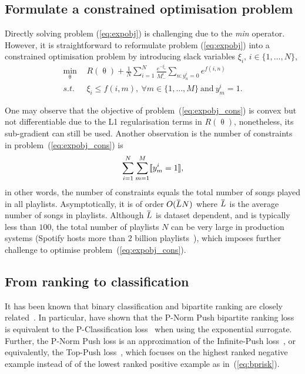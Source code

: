 \subsection{Formulate a constrained optimisation problem}



Directly solving problem (\ref{eq:expobj}) is challenging due to the \emph{min} operator.
However, it is straightforward to reformulate problem (\ref{eq:expobj}) into a constrained optimisation problem
by introducing slack variables $\xi_i, \, i \in \{1,\dots,N\}$,
\begin{equation}
\label{eq:expobj_cons}
\begin{aligned}
\min_{\uptheta} \ \, & R(\uptheta) + \frac{1}{N} \sum_{i=1}^N \frac{e^{-\xi_i}}{M_-^i} \sum_{n: y_n^i = 0} e^{f(i, n)} \\
s.t. \ \, & \xi_i \le f(i, m), \ \forall m \in \{1,\dots,M\} \ \text{and} \ y_m^i = 1.
\end{aligned}
\end{equation}

One may observe that the objective of problem~(\ref{eq:expobj_cons}) is convex but not differentiable due to the L1 regularisation terms in $R(\uptheta)$,
nonetheless, its sub-gradient can still be used.
Another observation is the number of constraints in problem~(\ref{eq:expobj_cons}) is
$$
\sum_{i=1}^N \sum_{m=1}^M \llbracket y_m^i = 1 \rrbracket,
$$
in other words, the number of constraints equals the total number of songs played in all playlists.
Asymptotically, it is of order $O(\widebar{L} N)$ where $\widebar{L}$ is the average number of songs in playlists.
Although $\widebar{L}$ is dataset dependent, and is typically less than $100$,
the total number of playlists $N$ can be very large in production systems (\eg Spotify hosts more than $2$ billion playlists~\cite{recsysch2018}),
which imposes further challenge to optimise problem~(\ref{eq:expobj_cons}).




\subsection{From ranking to classification}

It has been known that binary classification and bipartite ranking are
closely related~\cite{ertekin2011equivalence,menon2016bipartite}.
In particular, \citet{ertekin2011equivalence} have shown that the P-Norm Push bipartite ranking loss~\cite{rudin2009p}
is equivalent to the P-Classification loss~\cite{ertekin2011equivalence} when using the exponential surrogate.
Further, the P-Norm Push loss is an approximation of the Infinite-Push loss~\cite{agarwal2011infinite},
or equivalently, the Top-Push loss~\cite{li2014top}, which focuses on the highest ranked negative example instead of
of the lowest ranked positive example as in~(\ref{eq:bprisk}).

